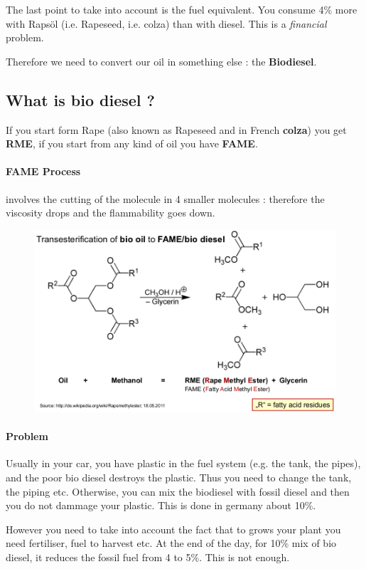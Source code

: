 \documentclass[10pt,a4paper]{article}
\begin{document}
The last point to take into account is the fuel equivalent. You consume 4\% more with Rapsöl (i.e. Rapeseed, i.e. colza) than with diesel. This is a \emph{financial} problem.

Therefore we need to convert our oil in something else : the \textbf{Biodiesel}.

\subsection{What is bio diesel ?}
If you start form Rape (also known as Rapeseed and in French \textbf{colza}) you get \textbf{RME}, if you start from any kind of oil you have \textbf{FAME}.

\paragraph{FAME Process}involves the cutting of the molecule in 4 smaller molecules : therefore the viscosity drops and the flammability goes down.

\begin{figure}
\includegraphics[scale=0.5]{Image/FAME.png}
\end{figure}

\paragraph{Problem}Usually in your car, you have plastic in the fuel system (e.g. the tank, the pipes), and the poor bio diesel destroys the plastic. Thus you need to change the tank, the piping etc. Otherwise, you can mix the biodiesel with fossil diesel and then you do not dammage your plastic. This is done in germany about 10\%.

However you need to take into account the fact that to grows your plant you need fertiliser, fuel to harvest etc. At the end of the day, for 10\% mix of bio diesel, it reduces the fossil fuel from 4 to 5\%. This is not enough.
\end{document}
